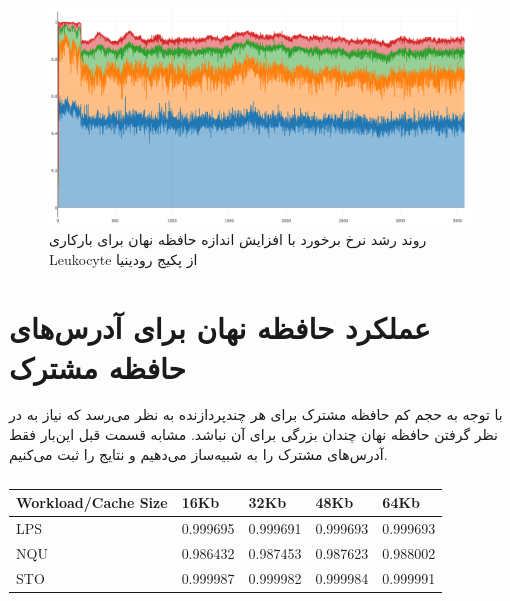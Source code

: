 \documentclass{thesis}
\begin{document}
\begin{figure}
\centering
\includegraphics[width=\textwidth]{./pics/rodinia_leukocyte_all_windows}
\caption{%
روند رشد نرخ برخورد با افزایش اندازه حافظه نهان برای بارکاری
Leukocyte
از پکیج
رودینیا
}
\end{figure}

\section{
عملکرد حافظه نهان برای آدرس‌های حافظه مشترک
}

با توجه به حجم کم حافظه مشترک برای هر چندپردازنده به نظر می‌رسد که نیاز به در نظر گرفتن حافظه نهان چندان بزرگی برای آن نباشد. مشابه قسمت قبل  این‌بار فقط آدرس‌های مشترک را به شبیه‌ساز می‌دهیم و نتایج را ثبت می‌کنیم.

\begin{center}
\begin{table}[h!]
\begin{latin}
\begin{tabular}{|p{}|p{}|p{}|p{}|p{}|}
\hline
Workload/Cache Size & 16Kb  & 32Kb  & 48Kb  & 64Kb \\
\hline
LPS                 & 0.999695 & 0.999691 & 0.999693 & 0.999693 \\
\hline
NQU                 & 0.986432 & 0.987453 & 0.987623 & 0.988002 \\
\hline
STO                 & 0.999987 & 0.999982 & 0.999984 & 0.999991 \\
\hline
\end{tabular}
\end{latin}
\caption{%
}
\label{table:parboilhitrate}
\end{table}
\end{center}
\end{document}
